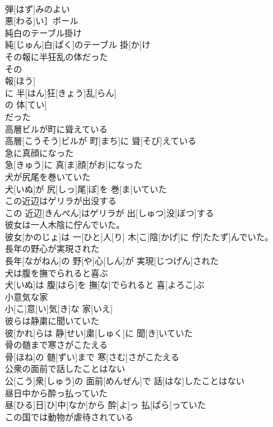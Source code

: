\documentclass[8pt]{extreport}
\begin{document}
\begin{CJK}{UTF8}{min}
\\	弾[はず]みのよい
\\	悪[わる]い］ボール
\\	純白のテーブル掛け	
\\	純[じゅん]白[ぱく]のテーブル 掛[か]け
\\	その報に半狂乱の体だった	
\\	その 
\\	報[ほう]
\\	に 半[はん]狂[きょう]乱[らん]
\\	の 体[てい]
\\	だった
\\	高層ビルが町に聳えている	
\\	高層[こうそう]ビルが 町[まち]に 聳[そび]えている
\\	急に真顔になった	
\\	急[きゅう]に 真[ま]顔[がお]になった
\\	犬が尻尾を巻いていた	
\\	犬[いぬ]が 尻[しっ]尾[ぽ]を 巻[ま]いていた
\\	この近辺はゲリラが出没する	
\\	この 近辺[きんぺん]はゲリラが 出[しゅつ]没[ぼつ]する
\\	彼女は一人木陰に佇んでいた。	
\\	彼女[かのじょ]は 一[ひと]人[り] 木[こ]陰[かげ]に 佇[たたず]んでいた。
\\	長年の野心が実現された	
\\	長年[ながねん]の 野[や]心[しん]が 実現[じつげん]された
\\	犬は腹を撫でられると喜ぶ	
\\	犬[いぬ]は 腹[はら]を 撫[な]でられると 喜[よろこ]ぶ
\\	小意気な家	
\\	小[こ]意[い]気[き]な 家[いえ]
\\	彼らは静粛に聞いていた	
\\	彼[かれ]らは 静[せい]粛[しゅく]に 聞[き]いていた
\\	骨の髄まで寒さがこたえる	
\\	骨[ほね]の 髄[ずい]まで 寒[さむ]さがこたえる
\\	公衆の面前で話したことはない	
\\	公[こう]衆[しゅう]の 面前[めんぜん]で 話[はな]したことはない
\\	昼日中から酔っ払っていた	
\\	昼[ひる]日[ひ]中[なか]から 酔[よ]っ 払[ぱら]っていた
\\	この国では動物が虐待されている	

\end{CJK}
\end{document}
